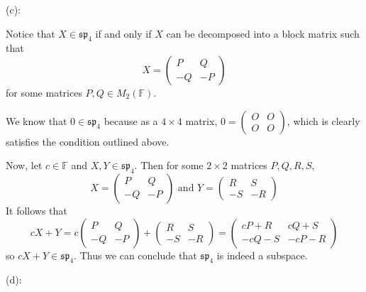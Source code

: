 \documentclass{article}
\theoremstyle{plain} %
\numberwithin{thm}{section} %
\theoremstyle{definition}
\begin{document}
\begin{question}{10}
        \medskip

        (c):

        Notice that \(X \in \mathfrak{sp}_4\) if and only if \(X\) can be decomposed into a block matrix such that
        \[
            X = \left( \begin{array}{c|c} P & Q \\ \hline -Q & -P \end{array} \right)
        \]
        for some matrices \(P,Q \in M_2(\mathbb{F})\).

        We know that \(0 \in \mathfrak{sp}_4\) because as a \(4\times 4\) matrix, \(0 = \left( \begin{array}{c|c} O & O \\ \hline O & O \end{array} \right)\), which is clearly satisfies the condition outlined above.

        Now, let \(c \in \mathbb{F}\) and \(X,Y \in \mathfrak{sp}_4\). Then for some \(2\times 2\) matrices \(P,Q,R,S\),
        \[
            X = \left( \begin{array}{c|c} P & Q \\ \hline -Q & -P \end{array} \right) \text{ and } Y = \left( \begin{array}{c|c} R & S \\ \hline -S & -R \end{array} \right)
        \]
        It follows that
        \[
            cX + Y = c\left( \begin{array}{c|c} P & Q \\ \hline -Q & -P \end{array} \right) + \left( \begin{array}{c|c} R & S \\ \hline -S & -R \end{array} \right) = \left( \begin{array}{c|c} cP + R & cQ + S \\ \hline -cQ -S & -cP-R \end{array} \right)
        \]
        so \(cX + Y \in \mathfrak{sp}_4\). Thus we can conclude that \(\mathfrak{sp}_4\) is indeed a subspace.

        \medskip

        (d):
    \end{question}
    \newpage
\end{document}
